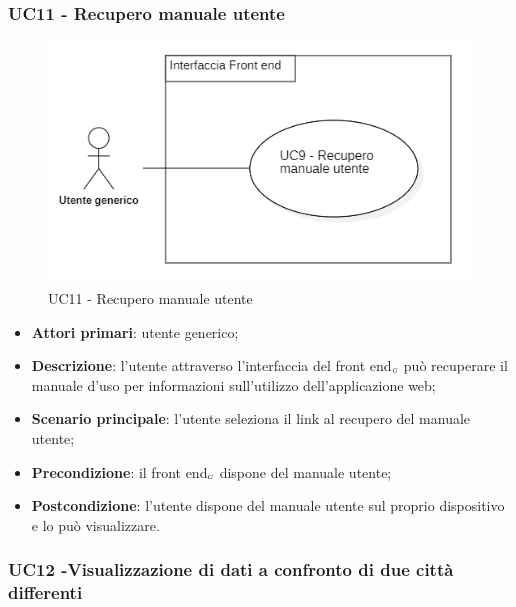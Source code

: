\subsubsection{UC11 - Recupero manuale utente}\label{CasiDUsoCasiDUsoFacoltativiTraUnUtenteEIlFrontEndElencoCasiDUsoUC11RecuperoManualeUtente}
\begin{center}
	\begin{figure}[H]
		\includegraphics[scale=0.7]{../immagini/attori_casi/uc9.png}
		\caption{UC11 - Recupero manuale utente}
	\end{figure}
\end{center}
\begin{itemize}
	\item \textbf{Attori primari}: utente generico;
	\item \textbf{Descrizione}: l'utente attraverso l'interfaccia del front end$_{\scaleto{G}{3pt}}$ può recuperare il manuale d'uso per informazioni sull'utilizzo dell'applicazione web;
	\item \textbf{Scenario principale}: l'utente seleziona il link al recupero del manuale utente;
	\item \textbf{Precondizione}: il front end$_{\scaleto{G}{3pt}}$ dispone del manuale utente;
	\item \textbf{Postcondizione}: l'utente dispone del manuale utente sul proprio dispositivo e lo può visualizzare. 
\end{itemize}

\subsubsection{UC12 -Visualizzazione di dati a confronto di due città differenti}\label{CasiDUsoCasiDUsoFacoltativiTraUnUtenteEIlFrontEndElencoCasiDUsoUC12VisualizzazioneDiDatiAConfrontoDiDueCittaDifferenti}

